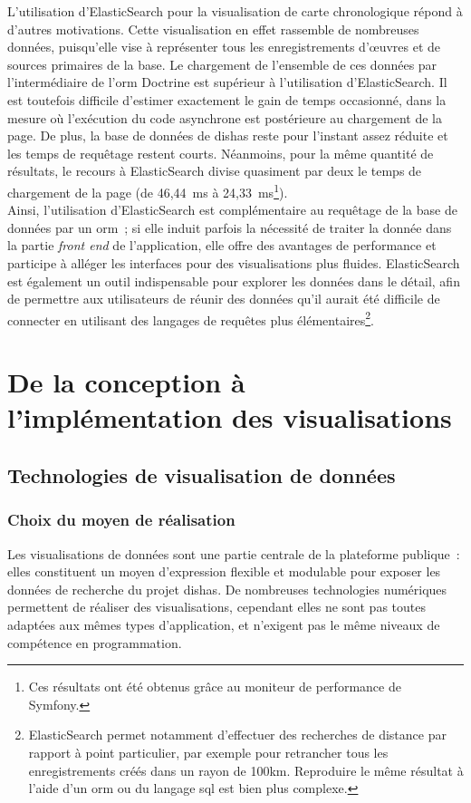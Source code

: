 \documentclass[a4paper,12pt,twoside]{book}
\newcommand{\clearemptydoublepage}{\newpage{\pagestyle{empty}\cleardoublepage}}
\newcommand{\eng}{\emph}
\newcommand{\bdd}{base de données\xspace}
\newcommand{\dishas}{\gls{dishas}\xspace}
\newcommand{\sql}{\gls{sql}\xspace}
\newcommand{\orm}{\gls{orm}\xspace}
\begin{document}
L'utilisation d'ElasticSearch pour la visualisation de carte chronologique répond à d'autres motivations. Cette visualisation en effet rassemble de nombreuses données, puisqu'elle vise à représenter tous les enregistrements d'œuvres et de sources primaires de la base. Le chargement de l'ensemble de ces données par l'intermédiaire de l'\orm Doctrine est supérieur à l'utilisation d'ElasticSearch. Il est toutefois difficile d'estimer exactement le gain de temps occasionné, dans la mesure où l'exécution du code asynchrone est postérieure au chargement de la page. De plus, la \bdd de \dishas reste pour l'instant assez réduite et les temps de requêtage restent courts. Néanmoins, pour la même quantité de résultats, le recours à ElasticSearch divise quasiment par deux le temps de chargement de la page (de 46,44~ms à 24,33~ms\footnote{Ces résultats ont été obtenus grâce au moniteur de performance de Symfony.}).\\

Ainsi, l'utilisation d'ElasticSearch est complémentaire au requêtage de la \bdd par un \orm~; si elle induit parfois la nécessité de traiter la donnée dans la partie \eng{front end} de l'application, elle offre des avantages de performance et participe à alléger les interfaces pour des visualisations plus fluides. ElasticSearch est également un outil indispensable pour explorer les données dans le détail, afin de permettre aux utilisateurs de réunir des données qu'il aurait été difficile de connecter en utilisant des langages de requêtes plus élémentaires\footnote{ElasticSearch permet notamment d'effectuer des recherches de distance par rapport à point particulier, par exemple pour retrancher tous les enregistrements créés dans un rayon de 100km. Reproduire le même résultat à l'aide d'un \orm ou du langage \sql est bien plus complexe.}.

\clearemptydoublepage

\chapter[De la conception à l'implémentation]{De la conception à l'implémentation des visualisations}
	\section{Technologies de visualisation de données}
		\subsection{Choix du moyen de réalisation}
Les visualisations de données sont une partie centrale de la plateforme publique~: elles constituent un moyen d'expression flexible et modulable pour exposer les données de recherche du projet \dishas. De nombreuses technologies numériques permettent de réaliser des visualisations, cependant elles ne sont pas toutes adaptées aux mêmes types d'application, et n'exigent pas le même niveaux de compétence en programmation.
\end{document}
